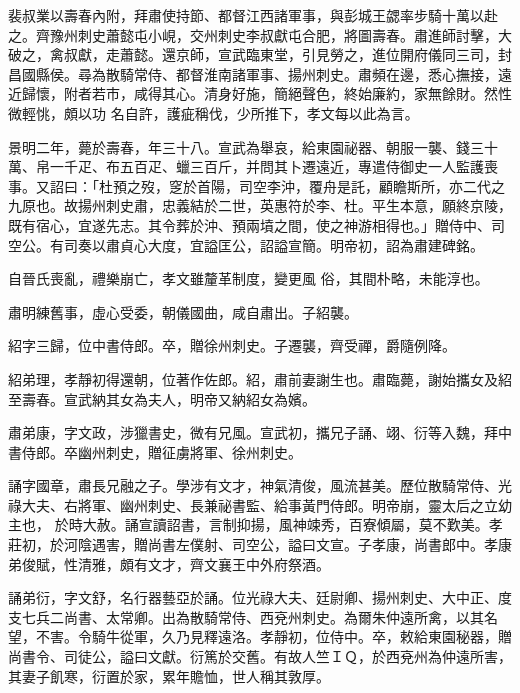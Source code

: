 \begin{pinyinscope}
 裴叔業以壽春內附，拜肅使持節、都督江西諸軍事，與彭城王勰率步騎十萬以赴之。齊豫州刺史蕭懿屯小峴，交州刺史李叔獻屯合肥，將圖壽春。肅進師討擊，大破之，禽叔獻，走蕭懿。還京師，宣武臨東堂，引見勞之，進位開府儀同三司，封昌國縣侯。尋為散騎常侍、都督淮南諸軍事、揚州刺史。肅頻在邊，悉心撫接，遠近歸懷，附者若市，咸得其心。清身好施，簡絕聲色，終始廉約，家無餘財。然性微輕恌，頗以功
 名自許，護疵稱伐，少所推下，孝文每以此為言。



 景明二年，薨於壽春，年三十八。宣武為舉哀，給東園祕器、朝服一襲、錢三十萬、帛一千疋、布五百疋、蠟三百斤，并問其卜遷遠近，專遣侍御史一人監護喪事。又詔曰：「杜預之歿，窆於首陽，司空李沖，覆舟是託，顧瞻斯所，亦二代之九原也。故揚州刺史肅，忠義結於二世，英惠符於李、杜。平生本意，願終京陵，既有宿心，宜遂先志。其令葬於沖、預兩墳之間，使之神游相得也。」贈侍中、司空公。有司奏以肅貞心大度，宜謚匡公，詔謚宣簡。明帝初，詔為肅建碑銘。



 自晉氏喪亂，禮樂崩亡，孝文雖釐革制度，變更風
 俗，其間朴略，未能淳也。



 肅明練舊事，虛心受委，朝儀國曲，咸自肅出。子紹襲。



 紹字三歸，位中書侍郎。卒，贈徐州刺史。子遷襲，齊受禪，爵隨例降。



 紹弟理，孝靜初得還朝，位著作佐郎。紹，肅前妻謝生也。肅臨薨，謝始攜女及紹至壽春。宣武納其女為夫人，明帝又納紹女為嬪。



 肅弟康，字文政，涉獵書史，微有兄風。宣武初，攜兄子誦、翊、衍等入魏，拜中書侍郎。卒幽州刺史，贈征虜將軍、徐州刺史。



 誦字國章，肅長兄融之子。學涉有文才，神氣清俊，風流甚美。歷位散騎常侍、光祿大夫、右將軍、幽州刺史、長兼祕書監、給事黃門侍郎。明帝崩，靈太后之立幼主也，
 於時大赦。誦宣讀詔書，言制抑揚，風神竦秀，百寮傾屬，莫不歎美。孝莊初，於河陰遇害，贈尚書左僕射、司空公，謚曰文宣。子孝康，尚書郎中。孝康弟俊賦，性清雅，頗有文才，齊文襄王中外府祭酒。



 誦弟衍，字文舒，名行器藝亞於誦。位光祿大夫、廷尉卿、揚州刺史、大中正、度支七兵二尚書、太常卿。出為散騎常侍、西兗州刺史。為爾朱仲遠所禽，以其名望，不害。令騎牛從軍，久乃見釋遠洛。孝靜初，位侍中。卒，敕給東園秘器，贈尚書令、司徒公，謚曰文獻。衍篤於交舊。有故人竺ＩＱ，於西兗州為仲遠所害，其妻子飢寒，衍置於家，累年贍恤，世人稱其敦厚。




\end{pinyinscope}
